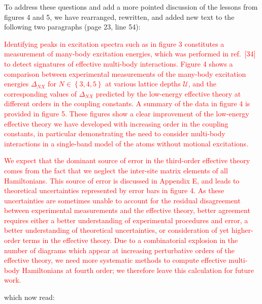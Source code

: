 \documentclass[preprint]{revtex4-1}
\renewcommand{\set}[1]{\left\{#1\right\}} %
\newcommand{\U}{\mathcal{U}}
\newcommand{\1}{\mathds{1}}
\newcommand{\red}[1]{\textcolor{red}{#1}}
\begin{document}
\begin{enumerate}
  To address these questions and add a more pointed discussion of the
  lessons from figures 4 and 5, we have rearranged, rewritten, and
  added new text to the following two paragraphs (page 23, line 54):

  \red{Identifying peaks in excitation spectra such as in figure 3
    constitutes a measurement of many-body excitation energies, which
    was performed in ref.~[34] to detect signatures of effective
    multi-body interactions.  Figure 4 shows a comparison between
    experimental measurements of the many-body excitation energies
    $\Delta_{NX}$ for $N\in\set{3,4,5}$ at various lattice depths
    $\U$, and the corresponding values of $\Delta_{NX}$ predicted by
    the low-energy effective theory at different orders in the
    coupling constants.  A summary of the data in figure 4 is provided
    in figure 5.  These figures show a clear improvement of the
    low-energy effective theory we have developed with increasing
    order in the coupling constants, in particular demonstrating the
    need to consider multi-body interactions in a single-band model of
    the atoms without motional excitations.}

  \red{We expect that the dominant source of error in the third-order
    effective theory comes from the fact that we neglect the
    inter-site matrix elements of all Hamiltonians.  This source of
    error is discussed in Appendix E, and leads to theoretical
    uncertainties represented by error bars in figure 4.  As these
    uncertainties are sometimes unable to account for the residual
    disagreement between experimental measurements and the effective
    theory, better agreement requires either a better understanding of
    experimental procedures and error, a better understanding of
    theoretical uncertainties, or consideration of yet higher-order
    terms in the effective theory.  Due to a combinatorial explosion
    in the number of diagrams which appear at increasing perturbative
    orders of the effective theory, we need more systematic methods to
    compute effective multi-body Hamiltonians at fourth order; we
    therefore leave this calculation for future work.}

  which now read:


\end{enumerate}
\end{document}
